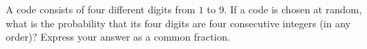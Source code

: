 A code consists of four different digits from $1$ to $9$. If a code is chosen at random, what is the probability that its four digits are four consecutive integers (in any order)? Express your answer as a common fraction.
